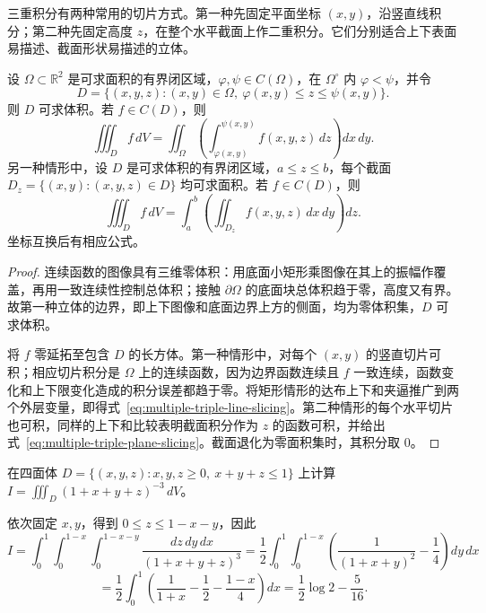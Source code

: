 三重积分有两种常用的切片方式。第一种先固定平面坐标 $(x,y)$，沿竖直线积分；第二种先固定高度 $z$，在整个水平截面上作二重积分。它们分别适合上下表面易描述、截面形状易描述的立体。

\begin{theorem}
\label{thm:multiple-triple-slicing}
设 $\Omega\subset\mathbb R^2$ 是可求面积的有界闭区域，$\varphi,\psi\in C(\Omega)$，在 $\Omega^\circ$ 内 $\varphi<\psi$，并令
\[
    D=\{(x,y,z):(x,y)\in\Omega,\ \varphi(x,y)\leq z\leq\psi(x,y)\}.
\]
则 $D$ 可求体积。若 $f\in C(D)$，则
\begin{equation}
    \iiint_Df\,dV
    =\iint_\Omega\left(\int_{\varphi(x,y)}^{\psi(x,y)}f(x,y,z)\,dz\right)dx\,dy.
    \label{eq:multiple-triple-line-slicing}
\end{equation}
另一种情形中，设 $D$ 是可求体积的有界闭区域，$a\leq z\leq b$，每个截面 $D_z=\{(x,y):(x,y,z)\in D\}$ 均可求面积。若 $f\in C(D)$，则
\begin{equation}
    \iiint_Df\,dV
    =\int_a^b\left(\iint_{D_z}f(x,y,z)\,dx\,dy\right)dz.
    \label{eq:multiple-triple-plane-slicing}
\end{equation}
坐标互换后有相应公式。
\end{theorem}
\begin{proof}
连续函数的图像具有三维零体积：用底面小矩形乘图像在其上的振幅作覆盖，再用一致连续性控制总体积；接触 $\partial\Omega$ 的底面块总体积趋于零，高度又有界。故第一种立体的边界，即上下图像和底面边界上方的侧面，均为零体积集，$D$ 可求体积。

将 $f$ 零延拓至包含 $D$ 的长方体。第一种情形中，对每个 $(x,y)$ 的竖直切片可积；相应切片积分是 $\Omega$ 上的连续函数，因为边界函数连续且 $f$ 一致连续，函数变化和上下限变化造成的积分误差都趋于零。将矩形情形的达布上下和夹逼推广到两个外层变量，即得式~\eqref{eq:multiple-triple-line-slicing}。第二种情形的每个水平切片也可积，同样的上下和比较表明截面积分作为 $z$ 的函数可积，并给出式~\eqref{eq:multiple-triple-plane-slicing}。截面退化为零面积集时，其积分取 $0$。
\end{proof}

\begin{example}
\label{ex:multiple-tetrahedron-integral}
在四面体 $D=\{(x,y,z):x,y,z\geq0,\ x+y+z\leq1\}$ 上计算 $\displaystyle I=\iiint_D(1+x+y+z)^{-3}\,dV$。
\end{example}
\begin{solve}
依次固定 $x,y$，得到 $0\leq z\leq1-x-y$，因此
\[
    I=\int_0^1\int_0^{1-x}\int_0^{1-x-y}
    \frac{dz\,dy\,dx}{(1+x+y+z)^3}
    =\frac12\int_0^1\int_0^{1-x}
    \left(\frac1{(1+x+y)^2}-\frac14\right)dy\,dx
\]
\[
    =\frac12\int_0^1\left(\frac1{1+x}-\frac12-\frac{1-x}{4}\right)dx
    =\frac12\log2-\frac5{16}.
\]
\end{solve}

